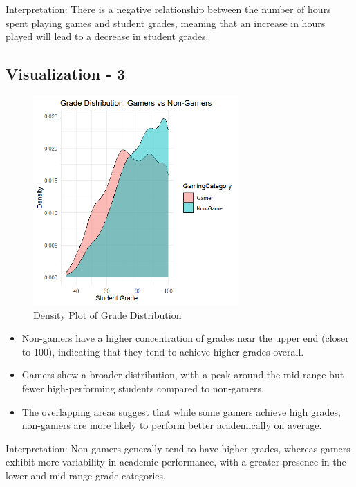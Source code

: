 \documentclass{article}
\begin{document}
Interpretation: There is a negative relationship between the number of hours spent playing games and student grades, meaning that an increase in hours played will lead to a decrease in student grades.

\vspace{4in}

\subsection{Visualization - 3}

\begin{figure}[h]
    \centering
    \includegraphics[width=0.7\textwidth]{PS6c_Bermudez.png}
    \caption{Density Plot of Grade Distribution}
    \label{fig:grade_distribution3}
\end{figure}

\begin{itemize}
    \item Non-gamers have a higher concentration of grades near the upper end (closer to 100), indicating that they tend to achieve higher grades overall.
    \item Gamers show a broader distribution, with a peak around the mid-range but fewer high-performing students compared to non-gamers.
    \item The overlapping areas suggest that while some gamers achieve high grades, non-gamers are more likely to perform better academically on average.
\end{itemize}

Interpretation: Non-gamers generally tend to have higher grades, whereas gamers exhibit more variability in academic performance, with a greater presence in the lower and mid-range grade categories.
\end{document}
